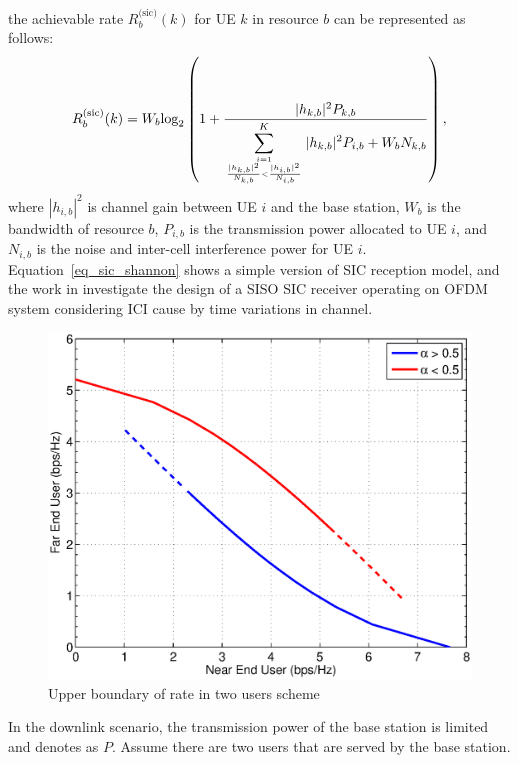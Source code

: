 the achievable rate $R_b^{\text{(sic)}}(k)$ for UE $k$ in resource $b$ can be represented as follows:
\begin{equation}
\label{eq_sic_shannon}
R_b^{\text{(sic)}}(k)=W_b \text{log}_2 \left(1+\frac{|h_{k, b}|^2 P_{k, b}}{\displaystyle\sum^K_{{i=1} \atop {\frac{|h_{k, b}|^2}{N_{k, b}} < \frac{|h_{i, b}|^2}{N_{i, b}}}} |h_{k, b}|^2 P_{i, b} +W_b N_{k, b}} \right),
\end{equation}
where $|h_{i, b}|^2$ is channel gain between UE $i$ and the base station, $W_b$ is the bandwidth of resource $b$, $P_{i, b}$ is the transmission power allocated to UE $i$, and $N_{i, b}$ is the noise and inter-cell interference power for UE $i$.
Equation~\ref{eq_sic_shannon} shows a simple version of SIC reception model,
and the work in \cite{A_Successive_Interference_Cancellation_Scheme_for_an_OFDM_system}
investigate the design of a SISO SIC receiver operating on OFDM system
considering ICI cause by time variations in channel.
\begin{figure}[t]
\begin{center}
\includegraphics[width=0.95\columnwidth ,angle=0]{figure/u1VSu2.eps}
\caption{Upper boundary of rate in two users scheme}
\label{fig_ideal_r1r2}
\end{center}
\end{figure}
In the downlink scenario, the transmission power of the base station is limited
and denotes as $P$.
Assume there are two users that are served by the base station.
